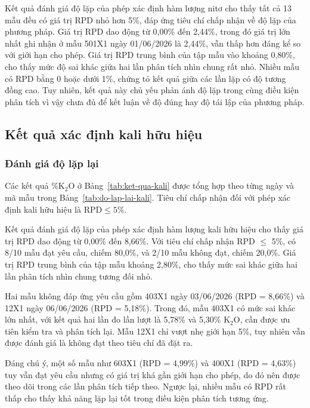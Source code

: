 {\scriptsize
\setlength{\tabcolsep}{3pt}
\renewcommand{\arraystretch}{1.2}

}

Kết quả đánh giá độ lặp của phép xác định hàm lượng nitơ cho thấy tất cả 13 mẫu đều có giá trị RPD nhỏ hơn 5\%, đáp ứng tiêu chí chấp nhận về độ lặp của phương pháp.
Giá trị RPD dao động từ 0,00\% đến 2,44\%, trong đó giá trị lớn nhất ghi nhận ở mẫu 501X1 ngày 01/06/2026 là 2,44\%, vẫn thấp hơn đáng kể so với giới hạn cho phép.
Giá trị RPD trung bình của tập mẫu vào khoảng 0,80\%, cho thấy mức độ sai khác giữa hai lần phân tích nhìn chung rất nhỏ.
Nhiều mẫu có RPD bằng 0 hoặc dưới 1\%, chứng tỏ kết quả giữa các lần lặp có độ tương đồng cao. 
Tuy nhiên, kết quả này chủ yếu phản ánh độ lặp trong cùng điều kiện phân tích vì vậy chưa đủ để kết luận về độ đúng hay độ tái lập của phương pháp.

\subsection{Kết quả xác định kali hữu hiệu}
\PotassiumResultsTable

\subsubsection{Đánh giá độ lặp lại}
Các kết quả \(\%\mathrm{K_2O}\) ở Bảng~\ref{tab:ket-qua-kali} được tổng hợp theo từng ngày và mã mẫu trong Bảng~\ref{tab:do-lap-lai-kali}. Tiêu chí chấp nhận đối với phép xác định kali hữu hiệu là $\mathrm{RPD}\leq5\%$.

{\scriptsize
\setlength{\tabcolsep}{3pt}
\renewcommand{\arraystretch}{1.2}

}

Kết quả đánh giá độ lặp của phép xác định hàm lượng kali hữu hiệu cho thấy giá trị RPD dao động từ 0,00\% đến 8,66\%.
Với tiêu chí chấp nhận RPD $\leq$ 5\%, có 8/10 mẫu đạt yêu cầu, chiếm 80,0\%, và 2/10 mẫu không đạt, chiếm 20,0\%.
Giá trị RPD trung bình của tập mẫu khoảng 2,80\%, cho thấy mức sai khác giữa hai lần phân tích nhìn chung tương đối nhỏ.

Hai mẫu không đáp ứng yêu cầu gồm 403X1 ngày 03/06/2026 (RPD = 8,66\%) và 12X1 ngày 06/06/2026 (RPD = 5,18\%).
Trong đó, mẫu 403X1 có mức sai khác lớn nhất, với kết quả hai lần đo lần lượt là 5,78\% và 5,30\% \(\mathrm{K_2O}\), cần được ưu tiên kiểm tra và phân tích lại. Mẫu 12X1 chỉ vượt nhẹ giới hạn 5\%, tuy nhiên vẫn được đánh giá là không đạt theo tiêu chí đã đặt ra.

Đáng chú ý, một số mẫu như 603X1 (RPD = 4,99\%) và 400X1 (RPD = 4,63\%) tuy vẫn đạt yêu cầu nhưng có giá trị khá gần giới hạn cho phép, do đó nên được theo dõi trong các lần phân tích tiếp theo.
Ngược lại, nhiều mẫu có RPD rất thấp cho thấy khả năng lặp lại tốt trong điều kiện phân tích tương ứng.

